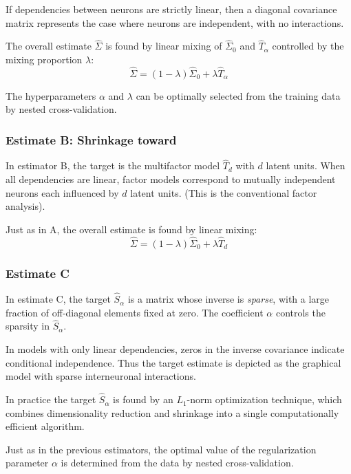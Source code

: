 If dependencies between neurons are strictly linear, then a diagonal covariance matrix represents the case where neurons are independent, with no interactions.

The overall estimate $\hat\Sigma$ is found by linear mixing of $\hat\Sigma_0$ and $ \hat T_\alpha$ controlled by the mixing proportion $\lambda$:
\begin{equation}
\hat\Sigma = (1-\lambda)\hat\Sigma_0 + \lambda\hat T_\alpha 
\end{equation}

The hyperparameters $ \alpha$ and $ \lambda$ can be optimally selected from the training data by nested cross-validation.

\subsubsection*{Estimate B: Shrinkage toward }
In estimator B, the target is the multifactor model $ \hat T_d$ with $ d$ latent units. When all dependencies are linear, factor models correspond to mutually independent neurons each influenced by $ d$ latent units. (This is  the conventional factor analysis).

Just as in A, the overall estimate is found by linear mixing:
\begin{equation}
\hat\Sigma = (1-\lambda)\hat\Sigma_0 + \lambda\hat T_d
\end{equation}

\subsubsection*{Estimate C}
In estimate C, the target $ \hat S_\alpha$ is a matrix whose inverse is \emph{sparse}, with a large fraction of off-diagonal elements fixed at zero. The coefficient $ \alpha$ controls the sparsity in $ \hat S_\alpha$.

In models with only linear dependencies, zeros in the inverse covariance indicate conditional independence. Thus the target estimate is depicted as the graphical model with sparse interneuronal interactions.

In practice the target $\hat S_\alpha$ is found by an $ L_1$-norm optimization technique, which combines dimensionality reduction and shrinkage into a single computationally efficient algorithm.

Just as in the previous estimators, the optimal value of the regularization parameter $ \alpha$ is determined from the data by nested cross-validation.

